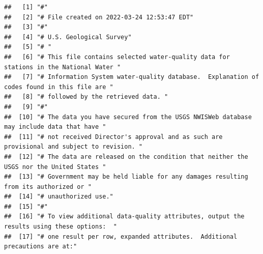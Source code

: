 \documentclass[
]{book}
\begin{document}
\begin{verbatim}
##   [1] "#"                                                                                                                                            
##   [2] "# File created on 2022-03-24 12:53:47 EDT"                                                                                                    
##   [3] "#"                                                                                                                                            
##   [4] "# U.S. Geological Survey"                                                                                                                     
##   [5] "# "                                                                                                                                           
##   [6] "# This file contains selected water-quality data for stations in the National Water "                                                         
##   [7] "# Information System water-quality database.  Explanation of codes found in this file are "                                                   
##   [8] "# followed by the retrieved data. "                                                                                                           
##   [9] "#"                                                                                                                                            
##  [10] "# The data you have secured from the USGS NWISWeb database may include data that have "                                                       
##  [11] "# not received Director's approval and as such are provisional and subject to revision. "                                                     
##  [12] "# The data are released on the condition that neither the USGS nor the United States "                                                        
##  [13] "# Government may be held liable for any damages resulting from its authorized or "                                                            
##  [14] "# unauthorized use."                                                                                                                          
##  [15] "#"                                                                                                                                            
##  [16] "# To view additional data-quality attributes, output the results using these options:  "                                                      
##  [17] "# one result per row, expanded attributes.  Additional precautions are at:"                                                                   

\end{verbatim}
\end{document}

